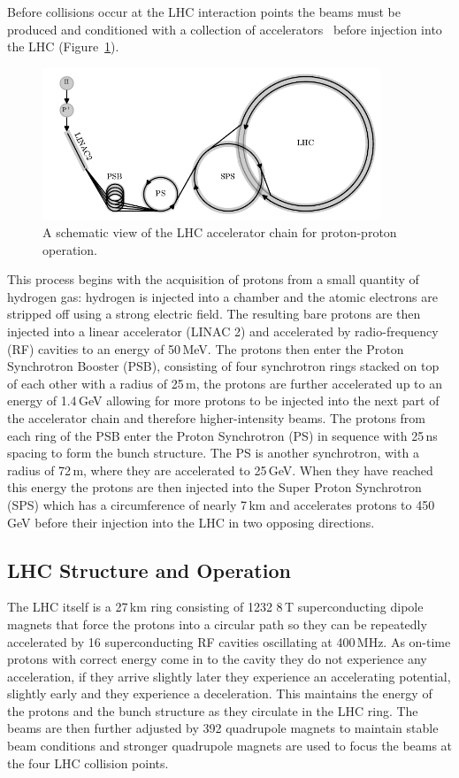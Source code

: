 Before collisions occur at the LHC interaction points the beams must be produced and conditioned with a collection of accelerators~\cite{CERN_accelerator_complex} before injection into the LHC (Figure~\ref{fig:apparatus:lhc_chain}).
\begin{figure}[h!]
    \centering
    \includegraphics[width=0.9\textwidth]{figures/apparatus/accel_chain.pdf}
    \caption{A schematic view of the LHC accelerator chain for proton-proton operation.}
    \label{fig:apparatus:lhc_chain}
\end{figure}
This process begins with the acquisition of protons from a small quantity of hydrogen gas: hydrogen is injected into a chamber and the atomic electrons are stripped off using a strong electric field. The resulting bare protons are then injected into a linear accelerator (LINAC 2) and accelerated by radio-frequency (RF) cavities to an energy of 50\,MeV. The protons then enter the Proton Synchrotron Booster (PSB), consisting of four synchrotron rings stacked on top of each other with a radius of 25\,m, the protons are further accelerated up to an energy of 1.4\,GeV allowing for more protons to be injected into the next part of the accelerator chain and therefore higher-intensity beams.
The protons from each ring of the PSB enter the Proton Synchrotron (PS) in sequence with 25\,ns spacing to form the bunch structure. The PS is another synchrotron, with a radius of 72\,m, where they are accelerated to 25\,GeV. 
When they have reached this energy the protons are then injected into the Super Proton Synchrotron (SPS) which has a circumference of nearly 7\,km and accelerates protons to 450\,GeV before their injection into the LHC in two opposing directions. 


\subsection{LHC Structure and Operation}
The LHC itself is a 27\,km ring consisting of 1232 8\,T superconducting dipole magnets that force the protons into a circular path so they can be repeatedly accelerated by 16 superconducting RF cavities oscillating at 400\,MHz. As on-time protons with correct energy come in to the cavity they do not experience any acceleration, if they arrive slightly later they experience an accelerating potential, slightly early and they experience a deceleration. This maintains the energy of the protons and the bunch structure as they circulate in the LHC ring. The beams are then further adjusted by 392 quadrupole magnets to maintain stable beam conditions and stronger quadrupole magnets are used to focus the beams at the four LHC collision points.

